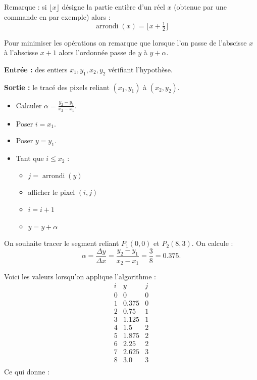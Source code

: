 \documentclass[11pt,class=report,crop=false]{standalone}
\begin{document}
Remarque :
si $\lfloor x \rfloor$ désigne la partie entière d'un réel $x$ (obtenue par une commande  en \Python{} par exemple) alors :
$$\operatorname{arrondi}(x) = \lfloor x + \tfrac12 \rfloor$$


Pour minimiser les opérations on remarque que lorsque l'on passe de l'abscisse $x$ à l'abscisse $x+1$ alors l'ordonnée passe de $y$ à $y + \alpha$.


\begin{algorithme}

\textbf{Entrée :} des entiers $x_1, y_1, x_2, y_2$ vérifiant l'hypothèse.

\textbf{Sortie :} le tracé des pixels reliant $(x_1,y_1)$ à $(x_2,y_2)$.

\begin{itemize}
	\item Calculer $\alpha =  \frac{y_2-y_1}{x_2-x_1}$.
	\item Poser $i = x_1$.
	\item Poser $y = y_1$.
	
	\item Tant que $i \le x_2$ :
	\begin{itemize}
		\item $j = \operatorname{arrondi}(y)$
		\item afficher le pixel $(i,j)$
		\item $i = i + 1$
		\item $y = y + \alpha$
	\end{itemize}
\end{itemize}
\end{algorithme}

\begin{exemple}	
On souhaite tracer le segment reliant $P_1(0,0)$ et $P_2(8,3)$.
On calcule :
$$\alpha =\frac{\Delta y}{\Delta x} = \frac{y_2-y_1}{x_2-x_1} = \frac38 = 0.375.$$

Voici les valeurs lorsqu'on applique l'algorithme :
$$\begin{array}{ccc}
i & y 		& j \\ \hline	
0 & 0       & 0 \\
1 & 0.375   & 0 \\
2 & 0.75    & 1 \\
3 & 1.125   & 1 \\
4 & 1.5     & 2 \\
5 & 1.875   & 2 \\
6 & 2.25    & 2 \\
7 & 2.625   & 3 \\
8 & 3.0     & 3 \\
\end{array}
$$
Ce qui donne :
\end{exemple}
\end{document}

